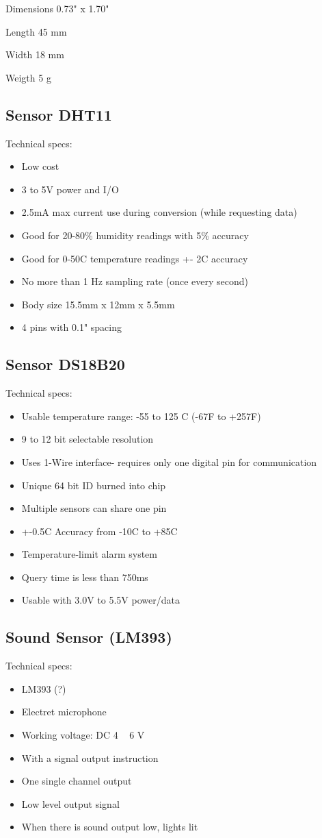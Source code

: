 \documentclass[12pt]{report}
\begin{document}
\begin{appendices}
Dimensions	0.73" x 1.70"

Length	45 mm

Width	18 mm

Weigth	5 g

\subsection*{Sensor DHT11}
Technical specs:
\begin{itemize}
\item Low cost
\item  3 to 5V power and I/O
\item   2.5mA max current use during conversion (while requesting data)
\item  Good for 20-80\% humidity readings with 5\% accuracy
 \item   Good for 0-50C temperature readings +- 2C accuracy
 \item   No more than 1 Hz sampling rate (once every second)
 \item   Body size 15.5mm x 12mm x 5.5mm
 \item   4 pins with 0.1" spacing

    \end{itemize}

\subsection*{Sensor DS18B20}
Technical specs:
\begin{itemize}
\item Usable temperature range: -55 to 125 C (-67F to +257F)
\item 9 to 12 bit selectable resolution
\item Uses 1-Wire interface- requires only one digital pin for communication
\item Unique 64 bit ID burned into chip
\item Multiple sensors can share one pin
\item +-0.5C Accuracy from -10C to +85C
\item Temperature-limit alarm system
\item Query time is less than 750ms
\item Usable with 3.0V to 5.5V power/data
\end{itemize}
\subsection*{Sound Sensor (LM393)}
Technical specs:
\begin{itemize}
\item LM393 (?)
\item Electret microphone
\item Working voltage: DC 4 ~ 6 V
\item With a signal output instruction
\item One single channel output
\item Low level output signal
\item When there is sound output low, lights lit
\end{itemize}

\end{appendices}
\end{document}
